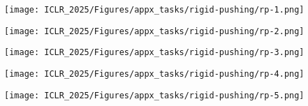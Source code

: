 \begin{figure*}[htb]
    \centering
    \begin{minipage}{0.19\textwidth}
            \centering
            \texttt{[image: ICLR\_2025/Figures/appx\_tasks/rigid-pushing/rp-1.png]}
    \end{minipage}
    \begin{minipage}{0.19\textwidth}
            \centering
            \texttt{[image: ICLR\_2025/Figures/appx\_tasks/rigid-pushing/rp-2.png]}
    \end{minipage}
    \begin{minipage}{0.19\textwidth}
            \centering
            \texttt{[image: ICLR\_2025/Figures/appx\_tasks/rigid-pushing/rp-3.png]}
    \end{minipage}
    \begin{minipage}{0.19\textwidth}
            \centering
            \texttt{[image: ICLR\_2025/Figures/appx\_tasks/rigid-pushing/rp-4.png]}
    \end{minipage}
    \begin{minipage}{0.19\textwidth}
            \centering
            \texttt{[image: ICLR\_2025/Figures/appx\_tasks/rigid-pushing/rp-5.png]}
    \end{minipage}

    \caption{
    }
    \label{fig:appendix_rigid_pushing_vis}
\end{figure*}